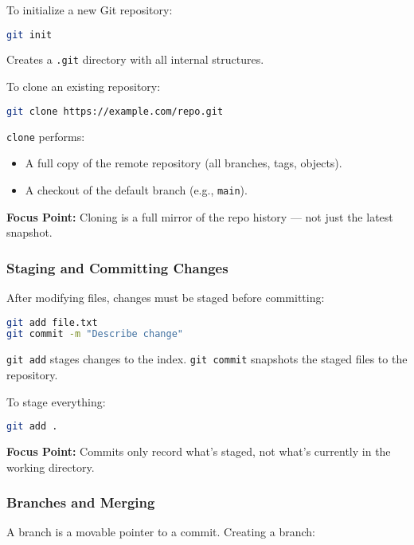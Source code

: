\documentclass[a4paper,12pt]{article}
\begin{document}
To initialize a new Git repository:

\begin{lstlisting}[language=bash]
git init
\end{lstlisting}

Creates a \texttt{.git} directory with all internal structures.

To clone an existing repository:

\begin{lstlisting}[language=bash]
git clone https://example.com/repo.git
\end{lstlisting}

\texttt{clone} performs:
\begin{itemize}
  \item A full copy of the remote repository (all branches, tags, objects).
  \item A checkout of the default branch (e.g., \texttt{main}).
\end{itemize}

\textbf{Focus Point:} Cloning is a full mirror of the repo history — not just the latest snapshot.

\subsubsection{Staging and Committing Changes}

After modifying files, changes must be staged before committing:

\begin{lstlisting}[language=bash]
git add file.txt
git commit -m "Describe change"
\end{lstlisting}

\texttt{git add} stages changes to the index. \texttt{git commit} snapshots the staged files to the repository.

To stage everything:

\begin{lstlisting}[language=bash]
git add .
\end{lstlisting}

\textbf{Focus Point:} Commits only record what’s staged, not what's currently in the working directory.

\subsubsection{Branches and Merging}

A branch is a movable pointer to a commit. Creating a branch:
\end{document}
